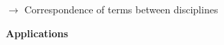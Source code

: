 {\medskip

$\rightarrow$ Correspondence of terms between disciplines

\bigskip
\bigskip





\textbf{Applications}

\medskip

}
